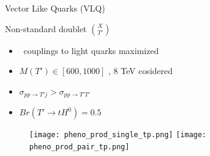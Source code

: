 \begin{frame}{Vector Like Quarks (VLQ)}
\vspace{-.2cm}
\begin{center}
\end{center}


\end{frame}


\begin{frame}{Non-standard doublet $\binom{X}{T'}$}
\vspace{-.3cm}

\begin{block}{}
\begin{itemize}\scriptsize
\item \Tp~couplings to light quarks maximized
\item $M(T')\in [600,1000]$ \GeVcc, 8 TeV cosidered
\item $\sigma_{pp\to T'j} > \sigma_{pp\to T'T'}$
\item $Br(T' \to tH^{0})=0.5$
\end{itemize}
\end{block}

\vspace{.3cm}
\begin{figure}[!Hhtbp]
  \begin{center}
    \texttt{[image: pheno\_prod\_single\_tp.png]}
    \texttt{[image: pheno\_prod\_pair\_tp.png]}
  \end{center}
\end{figure}

\end{frame}


